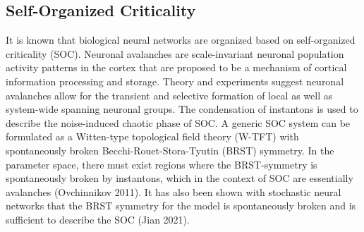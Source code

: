 \documentclass{article}
\begin{document}
    \subsection{Self-Organized Criticality}
    It is known that biological neural networks are organized based on self-organized criticality (SOC).  Neuronal avalanches are scale-invariant neuronal population activity patterns in the cortex that are proposed to be a mechanism of cortical information processing and storage. Theory and experiments suggest neuronal avalanches allow for the transient and selective formation of local as well as system-wide spanning neuronal groups. The condensation of instantons is used to describe the noise-induced chaotic phase of SOC. A generic SOC system can be formulated as a Witten-type topological field theory (W-TFT) with spontaneously broken Becchi-Rouet-Stora-Tyutin (BRST) symmetry. In the parameter space, there must exist regions where the BRST-symmetry is spontaneously broken by instantons, which in the context of SOC are essentially avalanches (Ovchinnikov 2011). It has also been shown with stochastic neural networks that the BRST symmetry for the model is spontaneously broken and is sufficient to describe the SOC (Jian 2021).

    
    
    
    
    
    
    
    
    
\end{document}
